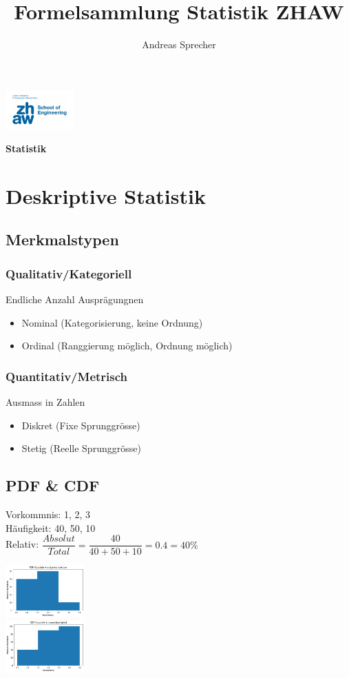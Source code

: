 \documentclass[8pt,a4paper]{scrartcl}
\title{Formelsammlung Statistik ZHAW}
\author{Andreas Sprecher}
\renewcommand{\emph}[1]{\textbf{#1}}                                                            %
\begin{document}
\begin{multicols*}{3}
\setlength{\columnseprule}{0.4pt}
    \parbox{3cm}{
        \includegraphics[height=1.5cm]{./img/Logo.jpeg}
    }
    \parbox{4cm}{
        \emph{\Large{Statistik}}
    }
    \vspace{-2mm} 

    \section{Deskriptive Statistik}
    		\subsection{Merkmalstypen}
    			\subsubsection{Qualitativ/Kategoriell}
    				Endliche Anzahl Ausprägungnen
    				\begin{itemize}\itemsep0pt				
					\item Nominal (Kategorisierung, keine Ordnung)
					\item Ordinal (Ranggierung möglich, Ordnung möglich)
				\end{itemize}
    			\subsubsection{Quantitativ/Metrisch}
    				Ausmass in Zahlen
    				\begin{itemize}\itemsep0pt				
					\item Diskret (Fixe Sprunggrösse)
					\item Stetig (Reelle Sprunggrösse)
				\end{itemize}
		\subsection{PDF \& CDF}
			Vorkommnis: 1, 2, 3 \\
			Häufigkeit: 40, 50, 10 \\
			Relativ: $\dfrac{Absolut}{Total} = \dfrac{40}{40+50+10} = 0.4 = 40 \%$\\
			\begin{multicols*}{2}
				\includegraphics[height=2cm]{img/pdf1.png} \\
				\includegraphics[height=2cm]{img/cdf1.png} \\
			\end{multicols*}
			

\end{multicols*}
\end{document}
